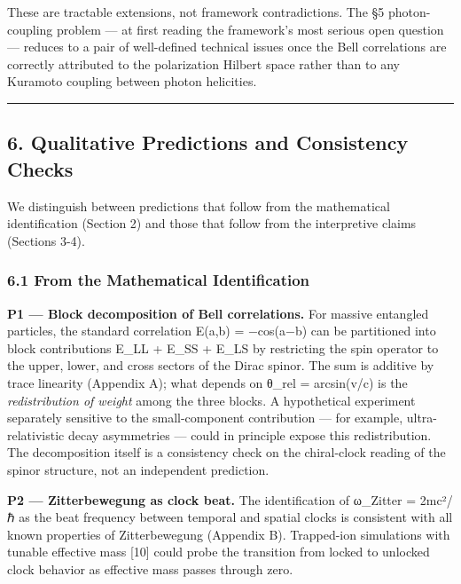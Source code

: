 \documentclass[
]{article}
\begin{document}
These are tractable extensions, not framework contradictions. The §5
photon-coupling problem --- at first reading the framework's most
serious open question --- reduces to a pair of well-defined technical
issues once the Bell correlations are correctly attributed to the
polarization Hilbert space rather than to any Kuramoto coupling between
photon helicities.

\begin{center}\rule{0.5\linewidth}{0.5pt}\end{center}

\subsection{6. Qualitative Predictions and Consistency
Checks}\label{qualitative-predictions-and-consistency-checks}

We distinguish between predictions that follow from the mathematical
identification (Section 2) and those that follow from the interpretive
claims (Sections 3-4).

\subsubsection{6.1 From the Mathematical
Identification}\label{from-the-mathematical-identification}

\textbf{P1 --- Block decomposition of Bell correlations.} For massive
entangled particles, the standard correlation E(a,b) = −cos(a−b) can be
partitioned into block contributions E\_LL + E\_SS + E\_LS by
restricting the spin operator to the upper, lower, and cross sectors of
the Dirac spinor. The sum is additive by trace linearity (Appendix A);
what depends on θ\_rel = arcsin(v/c) is the \emph{redistribution of
weight} among the three blocks. A hypothetical experiment separately
sensitive to the small-component contribution --- for example,
ultra-relativistic decay asymmetries --- could in principle expose this
redistribution. The decomposition itself is a consistency check on the
chiral-clock reading of the spinor structure, not an independent
prediction.

\textbf{P2 --- Zitterbewegung as clock beat.} The identification of
ω\_Zitter = 2mc²/ℏ as the beat frequency between temporal and spatial
clocks is consistent with all known properties of Zitterbewegung
(Appendix B). Trapped-ion simulations with tunable effective mass
{[}10{]} could probe the transition from locked to unlocked clock
behavior as effective mass passes through zero.
\end{document}
